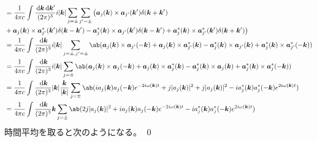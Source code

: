 \documentclass[uplatex,dvipdfmx,a4paper,11pt]{jlreq}
\makeatletter
\newcommand{\RR}{\mathbb{R}}
\newcommand{\kk}{\bm{k}}
\newcommand{\LL}{\bm{L}}
\theoremstyle{definition}
\renewenvironment{proof}[1][\proofname]{\par
  \normalfont
  \topsep6\p@\@plus6\p@ \trivlist
  \item[\hskip\labelsep{\bfseries #1}\@addpunct{\bfseries}]\ignorespaces\quad\par
}{%
  \qed\endtrivlist\@endpefalse
}
\renewcommand\proofname{証明}
\makeatother
\begin{document}
\begin{proof}
\begin{align}
     & = \frac{1}{4\pi c}\int\frac{\dl{\kk}\dl{\kk'}}{(2\pi)^3}i|\kk|\sum_{j=\pm}\sum_{j'=\pm}\big(\bm{a}_j(\kk)\times\bm{a}_{j'}(\kk')\delta(\kk + \kk')                                                                                                                                                                   \\
     & + \bm{a}_j(\kk)\times\bm{a}_{j'}^*(\kk')\delta(\kk - \kk') - \bm{a}_j^*(\kk)\times\bm{a}_{j'}(\kk')\delta(\kk - \kk') + \bm{a}_j^*(\kk)\times\bm{a}_{j'}^*(\kk')\delta(\kk + \kk')\big)                                                                                                                              \\
     & = \frac{1}{4\pi c}\int\frac{\dl{\kk}}{(2\pi)^3}i|\kk|\sum_{j=\pm, j'=\pm}\ab(\bm{a}_j(\kk)\times\bm{a}_{j'}(-\kk) + \bm{a}_j(\kk)\times\bm{a}_{j'}^*(\kk) - \bm{a}_j^*(\kk)\times\bm{a}_{j'}(\kk) + \bm{a}_j^*(\kk)\times\bm{a}_{j'}^*(-\kk))                                                                        \\
     & = \frac{1}{4\pi c}\int\frac{\dl{\kk}}{(2\pi)^3}i|\kk|\sum_{j=\pm}\ab(\bm{a}_j(\kk)\times\bm{a}_j(-\kk) + \bm{a}_j(\kk)\times\bm{a}_j^*(\kk) - \bm{a}_j^*(\kk)\times\bm{a}_j(\kk) + \bm{a}_j^*(\kk)\times\bm{a}_j^*(-\kk))                                                                                            \\
     & = \frac{1}{4\pi c}\int\frac{\dl{\kk}}{(2\pi)^3}|\kk|\frac{\kk}{|\kk|}\sum_{j=\pm}\ab(ia_j(\kk)a_j(-\kk)e^{-2i\omega(\kk)t} + j|a_j(\kk)|^2 + j|a_j(\kk)|^2 - ia_j^*(\kk)a_j^*(-\kk)e^{2i\omega(\kk)t})                                                                                                               \\
     & = \frac{1}{4\pi c}\int\frac{\dl{\kk}}{(2\pi)^3}\kk\sum_{j=\pm}\ab(2j|a_j(\kk)|^2 + ia_j(\kk)a_j(-\kk)e^{-2i\omega(\kk)t} - ia_j^*(\kk)a_j^*(-\kk)e^{2i\omega(\kk)t})
  \end{align}
  時間平均を取ると次のようになる。
\end{proof}
\end{document}
